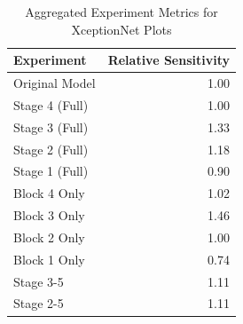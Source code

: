 \begin{table}
\caption{Aggregated Experiment Metrics for XceptionNet Plots}
\label{tab:exp_plot_data_xceptionnet}
\begin{tabular}{lr}
\toprule
Experiment & Relative Sensitivity \\
\midrule
Original Model & 1.00 \\
Stage 4 (Full) & 1.00 \\
Stage 3 (Full) & 1.33 \\
Stage 2 (Full) & 1.18 \\
Stage 1 (Full) & 0.90 \\
Block 4 Only & 1.02 \\
Block 3 Only & 1.46 \\
Block 2 Only & 1.00 \\
Block 1 Only & 0.74 \\
Stage 3-5 & 1.11 \\
Stage 2-5 & 1.11 \\
\bottomrule
\end{tabular}
\end{table}
